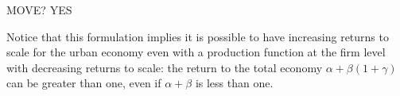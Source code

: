 


MOVE?  YES

 Notice that this formulation implies it is possible to have increasing returns to scale for the urban economy even with a production function at the firm level with decreasing returns to scale: the return to the total economy $\alpha + \beta(1 + \gamma)$ can be greater than one, even if $\alpha +\beta$ is less than one. %
 
